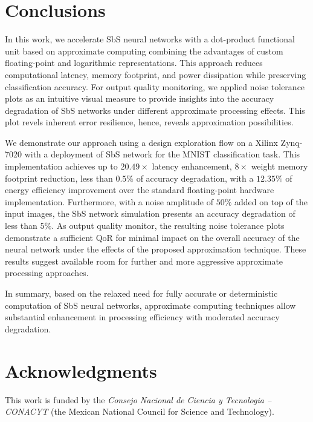 \section{Conclusions}
\label{sec:conclusions}
In this work, we accelerate SbS neural networks with a dot-product functional unit based on approximate computing combining the advantages of custom floating-point and logarithmic representations. This approach reduces computational latency, memory footprint, and power dissipation while preserving classification accuracy. For output quality monitoring, we applied noise tolerance plots as an intuitive visual measure to provide insights into the accuracy degradation of SbS networks under different approximate processing effects. This plot revels inherent error resilience, hence, reveals approximation possibilities.


We demonstrate our approach using a design exploration flow on a Xilinx Zynq-7020 with a deployment of SbS network for the MNIST classification task. This implementation achieves up to $20.49\times$ latency enhancement, $8\times$ weight memory footprint reduction, less than $0.5\%$ of accuracy degradation, with a $12.35\%$ of energy efficiency improvement over the standard floating-point hardware implementation. Furthermore, with a noise amplitude of $50\%$ added on top of the input images, the SbS network simulation presents an accuracy degradation of less than $5\%$. As output quality monitor, the resulting noise tolerance plots demonstrate a sufficient QoR for minimal impact on the overall accuracy of the neural network under the effects of the proposed approximation technique. These results suggest available room for further and more aggressive approximate processing approaches.


In summary, based on the relaxed need for fully accurate or deterministic computation of SbS neural networks, approximate computing techniques allow substantial enhancement in processing efficiency with moderated accuracy degradation.

\section * {Acknowledgments}\label{sec:Ack}
This work is funded by the \textit{Consejo Nacional de Ciencia y Tecnologia -- CONACYT} (the Mexican National Council for Science and Technology).
